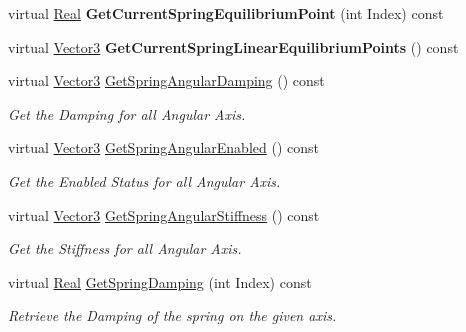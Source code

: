 \begin{DoxyCompactItemize}
\item 
\hypertarget{classMezzanine_1_1Generic6DofSpringConstraint_a4839ced960f8dc146f40348c3dd48ad4}{
virtual \hyperlink{namespaceMezzanine_a726731b1a7df72bf3583e4a97282c6f6}{Real} {\bfseries GetCurrentSpringEquilibriumPoint} (int Index) const }
\label{classMezzanine_1_1Generic6DofSpringConstraint_a4839ced960f8dc146f40348c3dd48ad4}

\item 
\hypertarget{classMezzanine_1_1Generic6DofSpringConstraint_abf7c52ae5cb63233605f76678def4dd6}{
virtual \hyperlink{classMezzanine_1_1Vector3}{Vector3} {\bfseries GetCurrentSpringLinearEquilibriumPoints} () const }
\label{classMezzanine_1_1Generic6DofSpringConstraint_abf7c52ae5cb63233605f76678def4dd6}

\item 
virtual \hyperlink{classMezzanine_1_1Vector3}{Vector3} \hyperlink{classMezzanine_1_1Generic6DofSpringConstraint_ada9393664bbecfc885680ae677de81a3}{GetSpringAngularDamping} () const 
\begin{DoxyCompactList}\small\item\em Get the Damping for all Angular Axis. \item\end{DoxyCompactList}\item 
virtual \hyperlink{classMezzanine_1_1Vector3}{Vector3} \hyperlink{classMezzanine_1_1Generic6DofSpringConstraint_a5fab32fcbad143365220f973d7bdd0cb}{GetSpringAngularEnabled} () const 
\begin{DoxyCompactList}\small\item\em Get the Enabled Status for all Angular Axis. \item\end{DoxyCompactList}\item 
virtual \hyperlink{classMezzanine_1_1Vector3}{Vector3} \hyperlink{classMezzanine_1_1Generic6DofSpringConstraint_ac01ebe7832f9e444554809f120f1662b}{GetSpringAngularStiffness} () const 
\begin{DoxyCompactList}\small\item\em Get the Stiffness for all Angular Axis. \item\end{DoxyCompactList}\item 
virtual \hyperlink{namespaceMezzanine_a726731b1a7df72bf3583e4a97282c6f6}{Real} \hyperlink{classMezzanine_1_1Generic6DofSpringConstraint_ae48fbe9f4e98f869a4a21f83735a3540}{GetSpringDamping} (int Index) const 
\begin{DoxyCompactList}\small\item\em Retrieve the Damping of the spring on the given axis. \item\end{DoxyCompactList}\item 

\end{DoxyCompactItemize}
